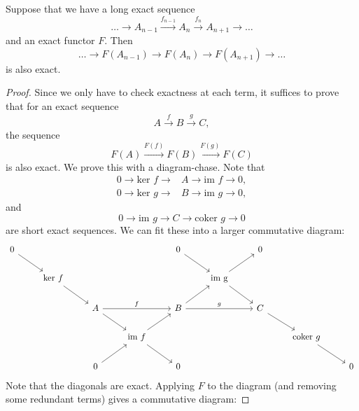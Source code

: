 \begin{lemma}
   Suppose that we have a long exact sequence
   \begin{equation*}
      \ldots \to A_{n-1} \xrightarrow{f_{n-1}} A_n \xrightarrow{f_n} A_{n+1} \to \ldots
   \end{equation*}
   and an exact functor $ F $. Then
   \begin{equation*}
      \ldots \to F(A_{n-1}) \to F(A_n) \to F(A_{n+1}) \to \ldots
   \end{equation*}
   is also exact.
\end{lemma}
\begin{proof}
   Since we only have to check exactness at each term, it suffices to prove that for an exact sequence
   \begin{equation*}
      A \xrightarrow{f} B \xrightarrow{g} C,
   \end{equation*}
   the sequence
   \begin{equation*}
      F(A) \xrightarrow{F(f)} F(B) \xrightarrow{F(g)} F(C)
   \end{equation*}
   is also exact. We prove this with a diagram-chase. Note that
   \begin{align*}
      0 \to \text{ker } f \to &A \to \text{im }f \to 0, \\
      0 \to \text{ker } g \to &B \to \text{im }g \to 0,
   \end{align*}
   and
   \begin{equation*}
      0 \to \text{im }g \to C \to \text{coker }g \to 0
   \end{equation*}
   are short exact sequences. We can fit these into a larger commutative diagram:
   \[\begin{tikzcd}
	   0 &&&& 0 && 0 \\
	     & {\text{ker } f} &&&& {\text{im g}} \\
	     && A && B && C \\
	     &&& {\text{im }f} &&&& {\text{coker }g} \\
	     && 0 && 0 &&&& 0
	     \arrow[from=1-1, to=2-2]
	     \arrow[from=2-2, to=3-3]
	     \arrow[from=3-3, to=4-4]
	     \arrow[from=4-4, to=5-5]
	     \arrow[from=5-3, to=4-4]
	     \arrow[from=4-4, to=3-5]
	     \arrow["f", from=3-3, to=3-5]
	     \arrow["g", from=3-5, to=3-7]
	     \arrow[from=3-5, to=2-6]
	     \arrow[from=2-6, to=1-7]
	     \arrow[from=1-5, to=2-6]
	     \arrow[from=2-6, to=3-7]
	     \arrow[from=3-7, to=4-8]
	     \arrow[from=4-8, to=5-9]
   \end{tikzcd}\]
   Note that the diagonals are exact. Applying $ F $ to the diagram (and removing some redundant terms) gives a commutative diagram:

\end{proof}

